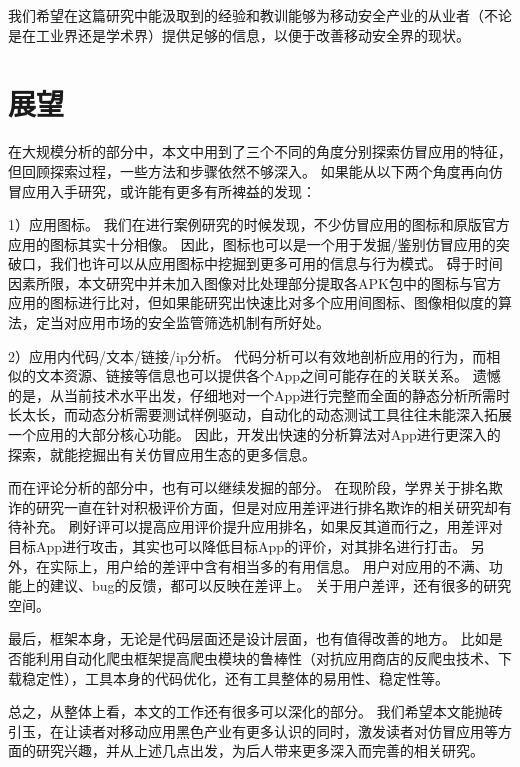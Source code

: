 我们希望在这篇研究中能汲取到的经验和教训能够为移动安全产业的从业者（不论是在工业界还是学术界）提供足够的信息，以便于改善移动安全界的现状。

\section{展望}

在大规模分析的部分中，本文中用到了三个不同的角度分别探索仿冒应用的特征，但回顾探索过程，一些方法和步骤依然不够深入。
如果能从以下两个角度再向仿冒应用入手研究，或许能有更多有所裨益的发现：

1）应用图标。
我们在进行案例研究的时候发现，不少仿冒应用的图标和原版官方应用的图标其实十分相像。
因此，图标也可以是一个用于发掘/鉴别仿冒应用的突破口，我们也许可以从应用图标中挖掘到更多可用的信息与行为模式。
碍于时间因素所限，本文研究中并未加入图像对比处理部分提取各APK包中的图标与官方应用的图标进行比对，但如果能研究出快速比对多个应用间图标、图像相似度的算法，定当对应用市场的安全监管筛选机制有所好处。

2）应用内代码/文本/链接/ip分析。
代码分析可以有效地剖析应用的行为，而相似的文本资源、链接等信息也可以提供各个App之间可能存在的关联关系。
遗憾的是，从当前技术水平出发，仔细地对一个App进行完整而全面的静态分析所需时长太长，而动态分析需要测试样例驱动，自动化的动态测试工具往往未能深入拓展一个应用的大部分核心功能。
因此，开发出快速的分析算法对App进行更深入的探索，就能挖掘出有关仿冒应用生态的更多信息。

而在评论分析的部分中，也有可以继续发掘的部分。
在现阶段，学界关于排名欺诈的研究一直在针对积极评价方面，但是对应用差评进行排名欺诈的相关研究却有待补充。
刷好评可以提高应用评价提升应用排名，如果反其道而行之，用差评对目标App进行攻击，其实也可以降低目标App的评价，对其排名进行打击。
另外，在实际上，用户给的差评中含有相当多的有用信息。
用户对应用的不满、功能上的建议、bug的反馈，都可以反映在差评上。
关于用户差评，还有很多的研究空间。

最后，\mytool 框架本身，无论是代码层面还是设计层面，也有值得改善的地方。
比如是否能利用自动化爬虫框架提高爬虫模块的鲁棒性（对抗应用商店的反爬虫技术、下载稳定性），工具本身的代码优化，还有工具整体的易用性、稳定性等。

总之，从整体上看，本文的工作还有很多可以深化的部分。
我们希望本文能抛砖引玉，在让读者对移动应用黑色产业有更多认识的同时，激发读者对仿冒应用等方面的研究兴趣，并从上述几点出发，为后人带来更多深入而完善的相关研究。
